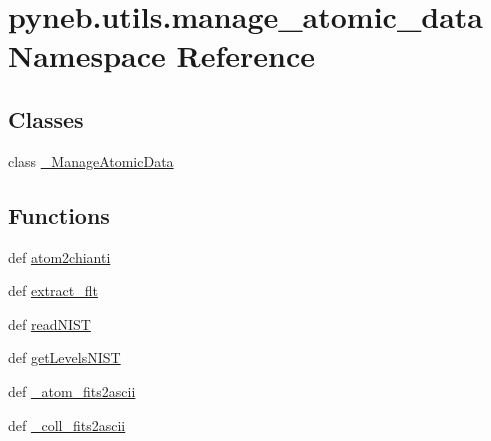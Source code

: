 \hypertarget{namespacepyneb_1_1utils_1_1manage__atomic__data}{\section{pyneb.\-utils.\-manage\-\_\-atomic\-\_\-data Namespace Reference}
\label{namespacepyneb_1_1utils_1_1manage__atomic__data}
}
\subsection*{Classes}
\begin{DoxyCompactItemize}
\item 
class \hyperlink{classpyneb_1_1utils_1_1manage__atomic__data_1_1___manage_atomic_data}{\-\_\-\-Manage\-Atomic\-Data}
\end{DoxyCompactItemize}
\subsection*{Functions}
\begin{DoxyCompactItemize}
\item 
def \hyperlink{namespacepyneb_1_1utils_1_1manage__atomic__data_a2c05deb31d8bc74727659c88846651a1}{atom2chianti}
\item 
def \hyperlink{namespacepyneb_1_1utils_1_1manage__atomic__data_afdff99c053c20f73c85c2f653a3e88cf}{extract\-\_\-flt}
\item 
def \hyperlink{namespacepyneb_1_1utils_1_1manage__atomic__data_a7cc94dc359981610066c8212bf4aed51}{read\-N\-I\-S\-T}
\item 
def \hyperlink{namespacepyneb_1_1utils_1_1manage__atomic__data_ad09376e8676854d44680ae14210b5589}{get\-Levels\-N\-I\-S\-T}
\item 
def \hyperlink{namespacepyneb_1_1utils_1_1manage__atomic__data_a98c41f7a8ffa3a9e23d64909eba559e1}{\-\_\-atom\-\_\-fits2ascii}
\item 
def \hyperlink{namespacepyneb_1_1utils_1_1manage__atomic__data_a1d70a5d8b876f114e058506cd9998de4}{\-\_\-coll\-\_\-fits2ascii}
\end{DoxyCompactItemize}


